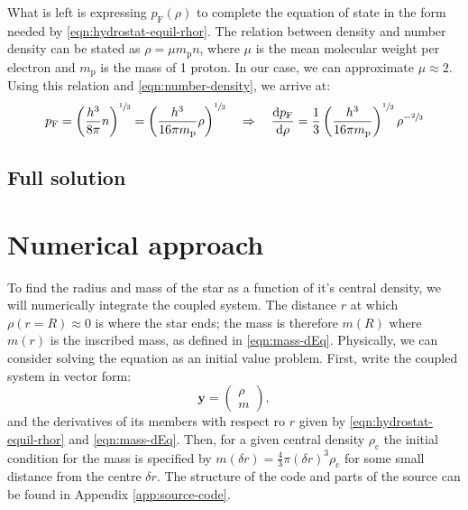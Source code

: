 \documentclass[]{article}
\newcommand{\dd}{\mathop{}\!\mathrm{d}}
\renewcommand{\vec}[1]{\boldsymbol{#1}}
\begin{document}
	What is left is expressing $p_\mathrm{F} (\rho)$ to complete the equation of state in the form needed by \eqref{eqn:hydrostat-equil-rhor}. The relation between density and number density can be stated as $\rho = \mu m_\mathrm{p} n$, where $\mu$ is the mean molecular weight per electron and $m_\mathrm{p}$ is the mass of 1 proton. In our case, we can approximate $\mu \approx 2$. Using this relation and \eqref{eqn:number-density}, we arrive at:
	\begin{equation}\label{eqn:fermi-mtm}
		p_\mathrm{F} = \left( \frac{h^3}{8 \pi} n \right)^{\sfrac{1}{3}} = \left( \frac{h^3}{16 \pi m_\mathrm{p}} \rho\right)^{\sfrac{1}{3}} \quad \Rightarrow \quad \frac{\dd p_\mathrm{F}}{\dd \rho} = \frac{1}{3} \left( \frac{h^3}{16 \pi m_\mathrm{p}}\right)^{\sfrac{1}{3}} \rho^{-\sfrac{2}{3}}
	\end{equation}

\subsection{Full solution}


\section{Numerical approach}\label{sec:numerical-approach}
	To find the radius and mass of the star as a function of it's central density, we will numerically integrate the coupled system. The distance $r$ at which $\rho (r=R) \approx 0$ is where the star ends; the mass is therefore $m(R)$ where $m(r)$ is the inscribed mass, as defined in \eqref{eqn:mass-dEq}. Physically, we can consider solving the equation as an initial value problem. First, write the coupled system in vector form:
	\begin{equation}
		\vec{y} = \begin{pmatrix}
			\rho \\
			m
		\end{pmatrix},
	\end{equation}
	and the derivatives of its members with respect ro $r$ given by \eqref{eqn:hydrostat-equil-rhor} and \eqref{eqn:mass-dEq}. Then, for a given central density $\rho_\mathrm{c}$ the initial condition for the mass is specified by $m(\delta r) = \frac{4}{3} \pi (\delta r)^3 \rho_\mathrm{c}$ for some small distance from the centre $\delta r$. The structure of the code and parts of the source can be found in Appendix \ref{app:source-code}.
\end{document}
